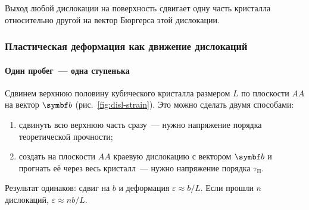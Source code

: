 \begin{glavnoe}
Выход любой дислокации на поверхность сдвигает одну часть кристалла
относительно другой на вектор Бюргерса этой дислокации.
\end{glavnoe}

\subsubsection{Пластическая деформация как движение дислокаций}

\paragraph{Один пробег~— одна ступенька}
Сдвинем верхнюю половину кубического кристалла размером $L$ по плоскости
$AA$ на вектор $\vb b$ (рис.~\ref{fig:disl-strain}). Это можно сделать
двумя способами:
\begin{enumerate}[label=\arabic*)]
\item сдвинуть всю верхнюю часть сразу~— нужно напряжение порядка
теоретической прочности;
\item создать на плоскости $AA$ краевую дислокацию с вектором $\vb b$ и
прогнать её через весь кристалл~— нужно напряжение порядка
$\tau_\text{П}$.
\end{enumerate}
Результат одинаков: сдвиг на $b$ и деформация $\varepsilon\approx b/L$.
Если прошли $n$ дислокаций, $\varepsilon\approx nb/L$.

